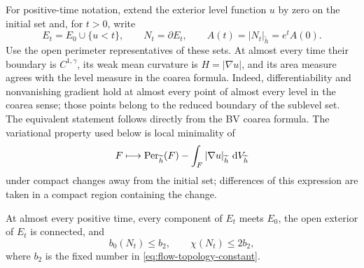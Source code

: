 For positive-time notation, extend the exterior level function $u$ by
zero on the initial set and, for $t>0$, write
\begin{equation}\label{eq:flow-levels}
 E_t=E_0\cup\{u<t\},\qquad N_t=\partial E_t,\qquad
 A(t)=|N_t|_{\widetilde h}=e^t A(0).
\end{equation}
Use the open perimeter representatives of these sets.  At almost every
time their boundary is $C^{1,\gamma}$, its weak mean curvature is
$H=|\nabla u|$, and its area measure agrees with the level measure in
the coarea formula.  Indeed, differentiability and nonvanishing
gradient hold at almost every point of almost every level in the
coarea sense; those points belong to the reduced boundary of the
sublevel set.  The equivalent statement follows directly from the BV
coarea formula.  The variational property used below is local
minimality of
\begin{equation}\label{eq:flow-variational-functional}
 F\longmapsto \operatorname{Per}_{\widetilde h}(F)
       -\int_F|\nabla u|_{\widetilde h}\,\mathop{}\!\mathrm d V_{\widetilde h}
\end{equation}
under compact changes away from the initial set; differences of this
expression are taken in a compact region containing the change.

\begin{lemma}\label{lem:hull-components}
At almost every positive time, every component of $E_t$ meets $E_0$,
the open exterior of $E_t$ is connected, and
\begin{equation}\label{eq:flow-component-bound}
 b_0(N_t)\le b_2,\qquad \chi(N_t)\le2b_2,
\end{equation}
where $b_2$ is the fixed number in
\eqref{eq:flow-topology-constant}.
\end{lemma}


